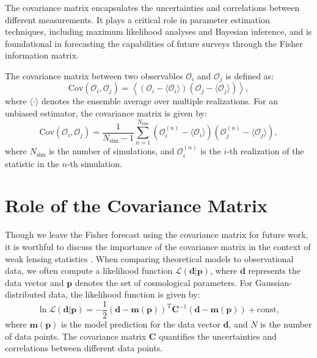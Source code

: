 The covariance matrix encapsulates the uncertainties and correlations between different measurements. It plays a critical role in parameter estimation techniques, including maximum likelihood analyses and Bayesian inference, and is foundational in forecasting the capabilities of future surveys through the Fisher information matrix.

The covariance matrix between two observables $\mathcal{O}_i$ and $\mathcal{O}_j$ is defined as:
\begin{equation}
    \mathrm{Cov}(\mathcal{O}_i, \mathcal{O}_j) = \left\langle (\mathcal{O}_i - \langle \mathcal{O}_i \rangle)(\mathcal{O}_j - \langle \mathcal{O}_j \rangle) \right\rangle,
\end{equation}
where $\langle \cdot \rangle$ denotes the ensemble average over multiple realizations.
For an unbiased estimator, the covariance matrix is given by:
\begin{equation}
    \label{eq:covariance}
    \mathrm{Cov}(\mathcal{O}_i, \mathcal{O}_j) = \frac{1}{N_{\mathrm{sim}} - 1} \sum_{n=1}^{N_{\mathrm{sim}}} (\mathcal{O}_i^{(n)} - \langle \mathcal{O}_i \rangle) (\mathcal{O}_j^{(n)} - \langle \mathcal{O}_j \rangle),
\end{equation}
where \( N_{\mathrm{sim}} \) is the number of simulations, and \( \mathcal{O}_i^{(n)} \) is the \( i \)-th realization of the statistic in the \( n \)-th simulation.

\section{Role of the Covariance Matrix}
Though we leave the Fisher forecast using the covariance matrix for future work, it is worthful to discuss the importance of the covariance matrix in the context of weak lensing statistics \citep{2004MNRAS.348..897T, 2005A&A...442...69K}. When comparing theoretical models to observational data, we often compute a likelihood function $\mathcal{L}(\mathbf{d} | \mathbf{p})$, where $\mathbf{d}$ represents the data vector and $\mathbf{p}$ denotes the set of cosmological parameters. For Gaussian-distributed data, the likelihood function is given by:
\begin{equation}
    \ln \mathcal{L}(\mathbf{d} | \mathbf{p}) = -\frac{1}{2}(\mathbf{d} - \mathbf{m}(\mathbf{p}))^{\mathrm{T}} \mathbf{C}^{-1} (\mathbf{d} - \mathbf{m}(\mathbf{p})) + \mathrm{const},
\end{equation}
where $\mathbf{m}(\mathbf{p})$ is the model prediction for the data vector $\mathbf{d}$, and $N$ is the number of data points. The covariance matrix $\mathbf{C}$ quantifies the uncertainties and correlations between different data points.

